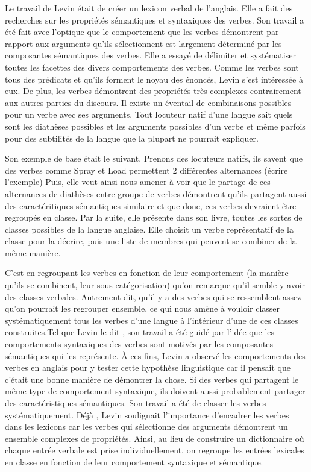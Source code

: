 Le travail de Levin était de créer un lexicon verbal de l'anglais. Elle a fait des recherches sur les propriétés sémantiques et syntaxiques des verbes. Son travail a été fait avec l'optique que le comportement que les verbes démontrent par rapport aux arguments qu'ils sélectionnent est largement déterminé par les composantes sémantiques des verbes. Elle a essayé de délimiter et systématiser toutes les facettes des divers comportements des verbes. Comme les verbes sont tous des prédicats et qu'ils forment le noyau des énoncés, Levin s'est intéressée à eux. De plus, les verbes démontrent des propriétés très complexes contrairement aux autres parties du discours. Il existe un éventail de combinaisons possibles pour un verbe avec ses arguments. Tout locuteur natif d'une langue sait quels sont les diathèses possibles et les arguments possibles d'un verbe et même parfois pour des subtilités de la langue que la plupart ne pourrait expliquer. 

Son exemple de base était le suivant. Prenons des locuteurs natifs, ils savent que des verbes comme Spray et Load permettent 2 différentes alternances (écrire l'exemple)
Puis, elle veut ainsi nous amener à voir que le partage de ces alternances de diathèses entre groupe de verbes démontrent qu'ils partagent aussi des caractéritiques sémantiques similaire et que donc, ces verbes devraient être regroupés en classe. Par la suite, elle présente dans son livre, toutes les sortes de classes possibles de la langue anglaise. Elle choisit un verbe représentatif de la classe pour la décrire, puis une liste de membres qui peuvent se combiner de la même manière.

C'est en regroupant les verbes en fonction de leur comportement (la manière qu'ils se combinent, leur sous-catégorisation) qu'on remarque qu'il semble y avoir des classes verbales. Autrement dit, qu'il y a des verbes qui se ressemblent assez qu'on pourrait les regrouper ensemble, ce qui nous amène à vouloir classer systématiquement tous les verbes d'une langue à l'intérieur d'une de ces classes construites.Tel que Levin le dit \citep{verb-classes.levin.1993}, son travail a été guidé par l'idée que les comportements syntaxiques des verbes sont motivés par les composantes sémantiques qui les représente. À ces fins, Levin a observé les comportements des verbes en anglais pour y tester cette hypothèse linguistique car il pensait que c'était une bonne manière de démontrer la chose. Si des verbes qui partagent le même type de comportement syntaxique, ils doivent aussi probablement partager des caractéristiques sémantiques. Son travail a été de classer les verbes systématiquement. Déjà , Levin soulignait l'importance d'encadrer les verbes dans les lexicons car les verbes qui sélectionne des arguments démontrent un ensemble complexes de propriétés. Ainsi, au lieu de construire un dictionnaire où chaque entrée verbale est prise individuellement, on regroupe les entrées lexicales en classe en fonction de leur comportement syntaxique et sémantique. 

